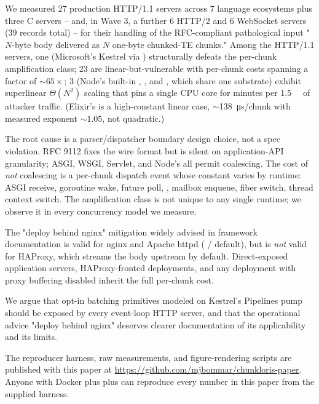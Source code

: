 We measured 27 production HTTP/1.1 servers across 7 language
ecosystems plus three C servers -- and, in Wave 3, a further 6
HTTP/2 and 6 WebSocket servers (39 records total) -- for their
handling of the RFC-compliant pathological input "$N$-byte body
delivered as $N$ one-byte chunked-TE chunks." Among the HTTP/1.1
servers, one (Microsoft's Kestrel via )
structurally defeats the per-chunk amplification class; 23 are
linear-but-vulnerable with per-chunk costs spanning a factor of
$\sim 65\times$; 3 (Node's built-in ,
, and , which share one substrate)
exhibit superlinear $\Theta(N^2)$ scaling that pins a single CPU
core for minutes per \SI{1.5}{\mebi\byte} of attacker traffic.
(Elixir's  is a high-constant linear case,
$\sim$\SI{138}{\micro\second}/chunk with measured exponent
$\sim 1.05$, not quadratic.)

The root cause is a parser/dispatcher boundary design choice, not
a spec violation. RFC 9112 fixes the wire format but is silent on
application-API granularity; ASGI, WSGI, Servlet, and Node's
 all permit coalescing. The cost of \emph{not}
coalescing is a per-chunk dispatch event whose constant varies by
runtime: ASGI receive, goroutine wake, future poll,
, mailbox enqueue, fiber switch, thread
context switch. The amplification class is not unique to any
single runtime; we observe it in every concurrency model we
measure.

The "deploy behind nginx" mitigation widely advised in framework
documentation is valid for nginx and Apache httpd
( / 
default), but is \emph{not} valid for HAProxy, which streams the
body upstream by default. Direct-exposed application servers,
HAProxy-fronted deployments, and any deployment with proxy
buffering disabled inherit the full per-chunk cost.

We argue that opt-in batching primitives modeled on Kestrel's
Pipelines pump should be exposed by every event-loop HTTP server,
and that the operational advice "deploy behind nginx" deserves
clearer documentation of its applicability and its limits.

The reproducer harness, raw measurements, and figure-rendering
scripts are published with this paper at
\url{https://github.com/mjbommar/chunkloris-paper}. Anyone with
Docker plus  plus  can reproduce every
number in this paper from the supplied harness.

